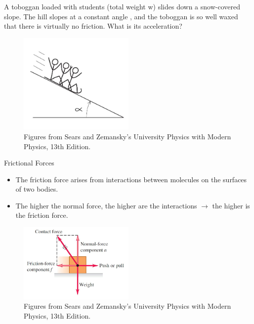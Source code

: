 \documentclass[]{beamer}
\begin{document}


    \begin{frame}
      
      A toboggan loaded with students (total weight w) slides down a
      snow-covered slope. The hill slopes at a constant angle , and the
      toboggan is so well waxed that there is virtually no friction. What
      is its acceleration?

      \begin{figure}[h!]  
        \includegraphics[width=0.5\textwidth]{images/f18.jpg}
        \caption{ {\tiny Figures from Sears and Zemansky's University Physics 
        with Modern Physics, 13th Edition.} }
      \end{figure}


      \end{frame}





    \begin{frame}
      
  Frictional Forces
\vspace{3mm}



\begin{itemize}
  \item The  friction force arises from interactions between molecules
  on the surfaces of two bodies.
  \item The higher the normal force, the higher are the interactions $\rightarrow$ the higher is the friction force.
\end{itemize}


\begin{figure}[h!]  
  \includegraphics[width=0.5\textwidth]{images/f19.jpg}
  \caption{ {\tiny Figures from Sears and Zemansky's University Physics 
  with Modern Physics, 13th Edition.} }
\end{figure}
      \end{frame}
\end{document}
